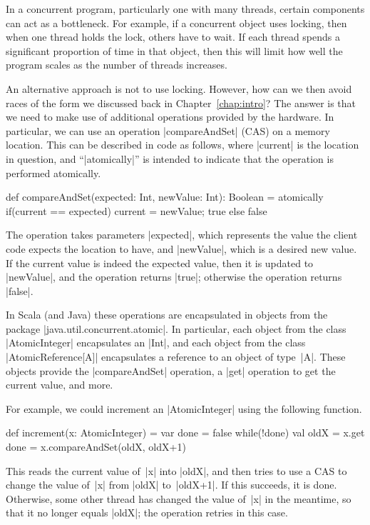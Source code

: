 In a concurrent program, particularly one with many threads, certain
components can act as a bottleneck.  For example, if a concurrent object uses
locking, then when one thread holds the lock, others have to wait.  If each
thread spends a significant proportion of time in that object, then this will
limit how well the program scales as the number of threads increases. 

An alternative approach is not to use locking.  However, how can we then avoid
races of the form we discussed back in Chapter~\ref{chap:intro}?  The answer
is that we need to make use of additional operations provided by the hardware.
In particular, we can use an operation
|compareAndSet| (CAS) on a memory location.  This
can be described in code as follows, where |current| is the location in
question, and ``|atomically|'' is intended to indicate that the operation is
performed atomically.
%
\begin{scala}
  def compareAndSet(expected: Int, newValue: Int): Boolean = atomically{
    if(current == expected){ current = newValue; true } else false
  }
\end{scala}
%
The operation takes parameters |expected|, which represents the value the
client code expects the location to have, and |newValue|, which is a desired
new value.  If the current value is indeed the expected value, then it is
updated to |newValue|, and the operation returns |true|; otherwise the
operation returns |false|.

In Scala (and Java) these operations are encapsulated in objects from the
package |java.util.concurrent.atomic|.  In particular, each object from the
class |AtomicInteger| encapsulates an |Int|, and each object from the class
|AtomicReference[A]| encapsulates a reference to an object of type~|A|.  These
objects provide the |compareAndSet| operation, a |get| operation to get the
current value, and more.

For example, we could increment an |AtomicInteger| using the following
function. 
%
\begin{scala} 
  def increment(x: AtomicInteger) = {
    var done = false
    while(!done){
      val oldX = x.get
      done = x.compareAndSet(oldX, oldX+1)
    }
  }
\end{scala}
%
This reads the current value of~|x| into |oldX|, and then tries to use a CAS
to change the value of~|x| from |oldX| to~|oldX+1|.  If this succeeds, it is
done.  Otherwise, some other thread has changed the value of~|x| in the
meantime, so that it no longer equals |oldX|; the operation retries in this
case.

